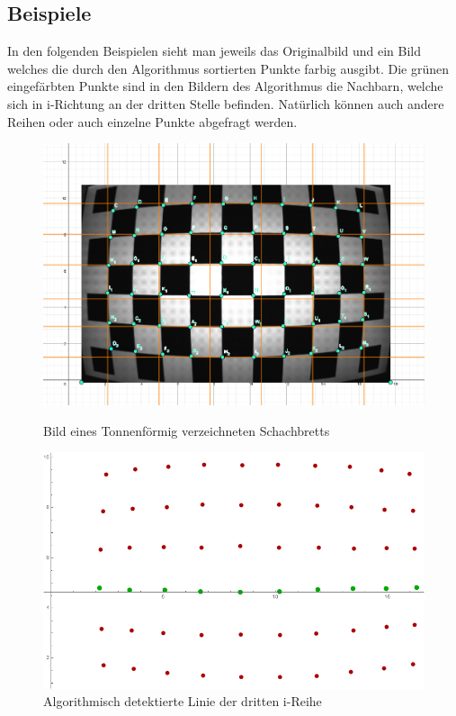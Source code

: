 \subsection{Beispiele}

In den folgenden Beispielen sieht man jeweils das Originalbild und ein Bild welches die durch den Algorithmus sortierten Punkte farbig ausgibt. Die grünen eingefärbten Punkte sind in den Bildern des Algorithmus die Nachbarn, welche sich in i-Richtung an der dritten Stelle befinden. Natürlich können auch andere Reihen oder auch einzelne Punkte abgefragt werden. 

\begin{figure}[!htb]
	\includegraphics[width=\linewidth]{images/Tonnenverzeichnung.png}
	\caption{Bild eines Tonnenförmig verzeichneten Schachbretts}
	\label{fig:awesome_image1}
	\endminipage\hfill
	\includegraphics[width=\linewidth]{images/AlgTonnenverzeichnung.png}
	\caption{Algorithmisch detektierte Linie der dritten i-Reihe}
	\label{fig:awesome_image2}
	\endminipage\hfill
\end{figure}

